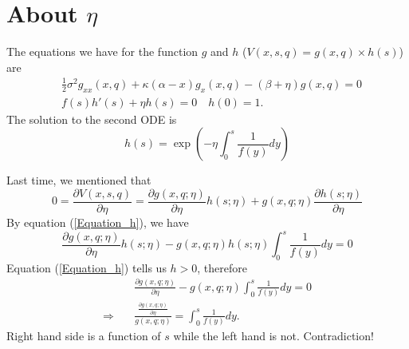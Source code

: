 \documentclass[paper=a4, fontsize=15pt]{scrartcl} %
\numberwithin{equation}{section} %
\numberwithin{figure}{section} %
\numberwithin{table}{section} %
\begin{document}

\section{About $\eta$}
The equations we have for the function $g$ and $h$ ($V(x,s,q) = g(x,q)\times h(s)$) are
\begin{equation*}
\begin{split}
  &\frac{1}{2} \sigma^2 g_{xx}(x,q) + \kappa (\alpha - x) g_x(x,q) - (\beta + \eta) g(x,q) = 0\\
  &f(s) h'(s) + \eta h(s) = 0 \quad h(0) = 1.
\end{split}
\end{equation*}
The solution to the second ODE is 
\begin{equation}\label{Equation_h}
  h(s) = \exp(-\eta \int_{0}^{s} \frac{1}{f(y)}dy)
\end{equation}

Last time, we mentioned that 
\begin{equation*}
  0 = \frac{\partial V(x,s,q)}{\partial \eta} = \frac{\partial g(x,q;\eta)}{\partial \eta} h(s;\eta) + g(x,q;\eta) \frac{\partial h(s;\eta)}{\partial \eta}
\end{equation*}
By equation (\ref{Equation_h}), we have
\begin{equation*}
  \frac{\partial g(x,q;\eta)}{\partial \eta} h(s;\eta) - g(x,q;\eta) h(s;\eta) \int_{0}^s\frac{1}{f(y)}dy = 0
\end{equation*}
Equation (\ref{Equation_h}) tells us $h>0$, therefore
\begin{equation*}
\begin{split}
&  \frac{\partial g(x,q;\eta)}{\partial \eta} - g(x,q;\eta)\int_{0}^s\frac{1}{f(y)}dy = 0 \\
\Rightarrow \quad & \frac{\frac{\partial g(x,q;\eta)}{\partial \eta}}{g(x,q;\eta)} = \int_{0}^s\frac{1}{f(y)}dy.
\end{split}
\end{equation*}
Right hand side is a function of $s$ while the left hand is not. Contradiction!
\end{document}
